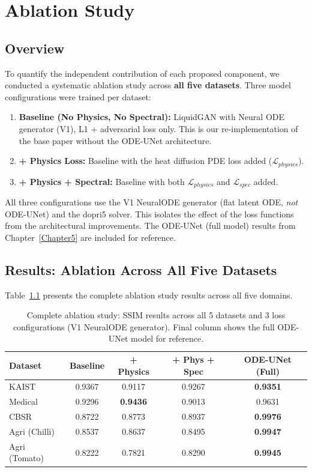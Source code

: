 \chapter{Ablation Study}
\label{Chapter6}

\section{Overview}

To quantify the independent contribution of each proposed component, we conducted a systematic ablation study across \textbf{all five datasets}. Three model configurations were trained per dataset:

\begin{enumerate}
    \item \textbf{Baseline (No Physics, No Spectral):} LiquidGAN with Neural ODE generator (V1), L1 + adversarial loss only. This is our re-implementation of the base paper without the ODE-UNet architecture.
    \item \textbf{+ Physics Loss:} Baseline with the heat diffusion PDE loss added ($\mathcal{L}_{physics}$).
    \item \textbf{+ Physics + Spectral:} Baseline with both $\mathcal{L}_{physics}$ and $\mathcal{L}_{spec}$ added.
\end{enumerate}

All three configurations use the V1 NeuralODE generator (flat latent ODE, \emph{not} ODE-UNet) and the dopri5 solver. This isolates the effect of the loss functions from the architectural improvements. The ODE-UNet (full model) results from Chapter~\ref{Chapter5} are included for reference.

\section{Results: Ablation Across All Five Datasets}

Table~\ref{tab:ablation_full} presents the complete ablation study results across all five domains.

\begin{table}[htbp]
\centering
\caption{Complete ablation study: SSIM results across all 5 datasets and 3 loss configurations (V1 NeuralODE generator). Final column shows the full ODE-UNet model for reference.}
\label{tab:ablation_full}
\begin{tabular}{lcccc}
\toprule
\textbf{Dataset} & \textbf{Baseline} & \textbf{+ Physics} & \textbf{+ Phys + Spec} & \textbf{ODE-UNet (Full)} \\
\midrule
KAIST        & 0.9367 & 0.9117 & 0.9267 & \textbf{0.9351} \\
Medical      & 0.9296 & \textbf{0.9436} & 0.9013 & 0.9631 \\
CBSR         & 0.8722 & 0.8773 & 0.8937 & \textbf{0.9976} \\
Agri (Chilli) & 0.8537 & 0.8637 & 0.8495 & \textbf{0.9947} \\
Agri (Tomato) & 0.8222 & 0.7821 & 0.8290 & \textbf{0.9945} \\
\bottomrule
\end{tabular}
\end{table}


